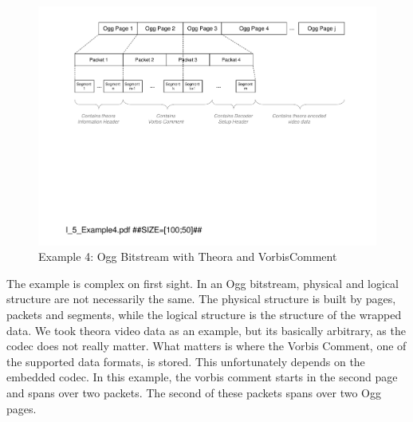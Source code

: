\begin{figure}[H]
	\centering
	\includegraphics[width=1.00\textwidth]{Figures/Part_I/I_5_Example4.pdf}
	\caption{Example 4: Ogg Bitstream with Theora and VorbisComment}
	\label{fig:Example4MP3filewithtwoID3tags}
\end{figure}

The example is complex on first sight. In an Ogg bitstream, physical and logical structure are not necessarily the same. The physical structure is built by pages, packets and segments, while the logical structure is the structure of the wrapped data. We took theora video data as an example, but its basically arbitrary, as the codec does not really matter. What matters is where the Vorbis Comment, one of the supported data formats, is stored. This unfortunately depends on the embedded codec. In this example, the vorbis comment starts in the second page and spans over two packets. The second of these packets spans over two Ogg pages.




